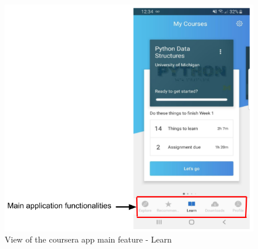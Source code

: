 \documentclass[version=last,fontsize=13pt]{scrartcl}
\begin{document}
\begin{appendices}
\begin{figure}[H]
\begin{subfigure}{.55\textwidth}
  \label{fig:sub2}
\end{subfigure}

\end{figure}

			\begin{figure}

				\includegraphics[scale = 0.5]{./imgs/CourseraApp}
				\caption{View of the coursera app main feature - Learn}
				\label{courseraApp2}
		
			\end{figure}


\end{appendices}
\end{document}
